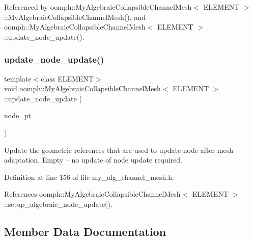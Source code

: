 Referenced by oomph\+::\+My\+Algebraic\+Collapsible\+Channel\+Mesh$<$ E\+L\+E\+M\+E\+N\+T $>$\+::\+My\+Algebraic\+Collapsible\+Channel\+Mesh(), and oomph\+::\+My\+Algebraic\+Collapsible\+Channel\+Mesh$<$ E\+L\+E\+M\+E\+N\+T $>$\+::update\+\_\+node\+\_\+update().

\mbox{\label{classoomph_1_1MyAlgebraicCollapsibleChannelMesh_adb6c8c672e0810b59174babf3623f5bd}} 
\subsubsection{\texorpdfstring{update\+\_\+node\+\_\+update()}{update\_node\_update()}}
{\footnotesize\ttfamily template$<$class E\+L\+E\+M\+E\+NT$>$ \\
void \hyperlink{classoomph_1_1MyAlgebraicCollapsibleChannelMesh}{oomph\+::\+My\+Algebraic\+Collapsible\+Channel\+Mesh}$<$ E\+L\+E\+M\+E\+NT $>$\+::update\+\_\+node\+\_\+update (\begin{DoxyParamCaption}\item[{Algebraic\+Node $\ast$\&}]{node\+\_\+pt }\end{DoxyParamCaption})\hspace{0.3cm}{\ttfamily [inline]}}



Update the geometric references that are used to update node after mesh adaptation. Empty -- no update of node update required. 



Definition at line 156 of file my\+\_\+alg\+\_\+channel\+\_\+mesh.\+h.



References oomph\+::\+My\+Algebraic\+Collapsible\+Channel\+Mesh$<$ E\+L\+E\+M\+E\+N\+T $>$\+::setup\+\_\+algebraic\+\_\+node\+\_\+update().



\subsection{Member Data Documentation}
\mbox{\label{classoomph_1_1MyAlgebraicCollapsibleChannelMesh_ad60e33d1b61229a7d591bd963713aa03}} 
